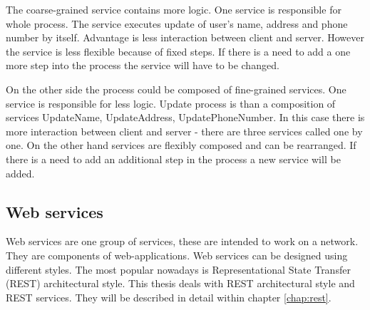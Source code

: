 The coarse-grained service contains more logic. One service is responsible for whole process. The service executes update of user's name, address and phone number by itself. Advantage is less interaction between client and server. However the service is less flexible because of fixed steps. If there is a need to add a one more step into the process the service will have to be changed.

On the other side the process could be composed of fine-grained services. One service is responsible for less logic. Update process is than a composition of services UpdateName, UpdateAddress, UpdatePhoneNumber. In this case there is more interaction between client and server - there are three services called one by one. On the other hand services are flexibly composed and can be rearranged. If there is a need to add an additional step in the process a new service will be added.


\subsection{Web services}
Web services are one group of services, these are intended to work on a network. They are components of \gls{web-applications}. Web services can be designed using different styles. The most popular nowadays is Representational State Transfer (REST) architectural style. This thesis deals with REST architectural style and REST services. They will be described in detail within chapter \ref{chap:rest}.


